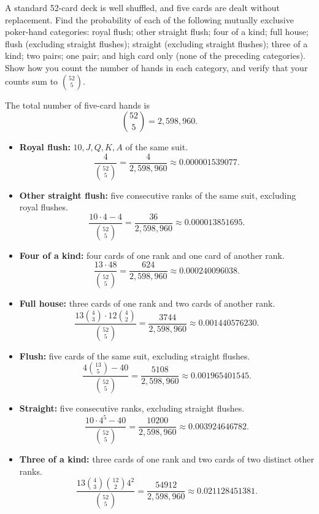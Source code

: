 \documentclass[11pt]{article}
\begin{document}
\begin{problem}[10]
A standard 52-card deck is well shuffled, and five cards are dealt without replacement.
Find the probability of each of the following mutually exclusive poker-hand categories:
royal flush; other straight flush; four of a kind; full house; flush (excluding straight flushes);
straight (excluding straight flushes); three of a kind; two pairs; one pair; and high card only
(none of the preceding categories). Show how you count the number of hands in each category,
and verify that your counts sum to $\binom{52}{5}$.
\end{problem}
\begin{solution}

The total number of five-card hands is
\[
\binom{52}{5}=2,598,960.
\]

\begin{itemize}

\item \textbf{Royal flush:} \(10,J,Q,K,A\) of the same suit.
\[
\frac{4}{\binom{52}{5}}
=
\frac{4}{2,598,960}
\approx 0.000001539077.
\]

\item \textbf{Other straight flush:} five consecutive ranks of the same suit, excluding royal flushes.
\[
\frac{10\cdot 4-4}{\binom{52}{5}}
=
\frac{36}{2,598,960}
\approx 0.000013851695.
\]

\item \textbf{Four of a kind:} four cards of one rank and one card of another rank.
\[
\frac{13\cdot 48}{\binom{52}{5}}
=
\frac{624}{2,598,960}
\approx 0.000240096038.
\]

\item \textbf{Full house:} three cards of one rank and two cards of another rank.
\[
\frac{13\binom{4}{3}\cdot 12\binom{4}{2}}
{\binom{52}{5}}
=
\frac{3744}{2,598,960}
\approx 0.001440576230.
\]

\item \textbf{Flush:} five cards of the same suit, excluding straight flushes.
\[
\frac{4\binom{13}{5}-40}{\binom{52}{5}}
=
\frac{5108}{2,598,960}
\approx 0.001965401545.
\]

\item \textbf{Straight:} five consecutive ranks, excluding straight flushes.
\[
\frac{10\cdot 4^5-40}{\binom{52}{5}}
=
\frac{10200}{2,598,960}
\approx 0.003924646782.
\]

\item \textbf{Three of a kind:} three cards of one rank and two cards of two distinct other ranks.
\[
\frac{
13\binom{4}{3}\binom{12}{2}4^2
}{
\binom{52}{5}
}
=
\frac{54912}{2,598,960}
\approx 0.021128451381.
\]


\end{itemize}
\end{solution}
\end{document}
